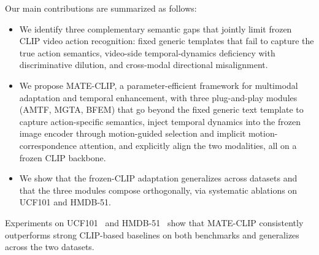 Our main contributions are summarized as follows:
\begin{itemize}
    \item We identify three complementary semantic gaps that jointly limit frozen CLIP video action recognition: fixed generic templates that fail to capture the true action semantics, video-side temporal-dynamics deficiency with discriminative dilution, and cross-modal directional misalignment.
    \item We propose MATE-CLIP, a parameter-efficient framework for multimodal adaptation and temporal enhancement, with three plug-and-play modules (AMTF, MGTA, BFEM) that go beyond the fixed generic text template to capture action-specific semantics, inject temporal dynamics into the frozen image encoder through motion-guided selection and implicit motion-correspondence attention, and explicitly align the two modalities, all on a frozen CLIP backbone.
    \item We show that the frozen-CLIP adaptation generalizes across datasets and that the three modules compose orthogonally, via systematic ablations on UCF101 and HMDB-51.
\end{itemize}
Experiments on UCF101~\cite{soomro2012ucf101} and HMDB-51~\cite{kuehne2011hmdb} show that MATE-CLIP consistently outperforms strong CLIP-based baselines on both benchmarks and generalizes across the two datasets.
